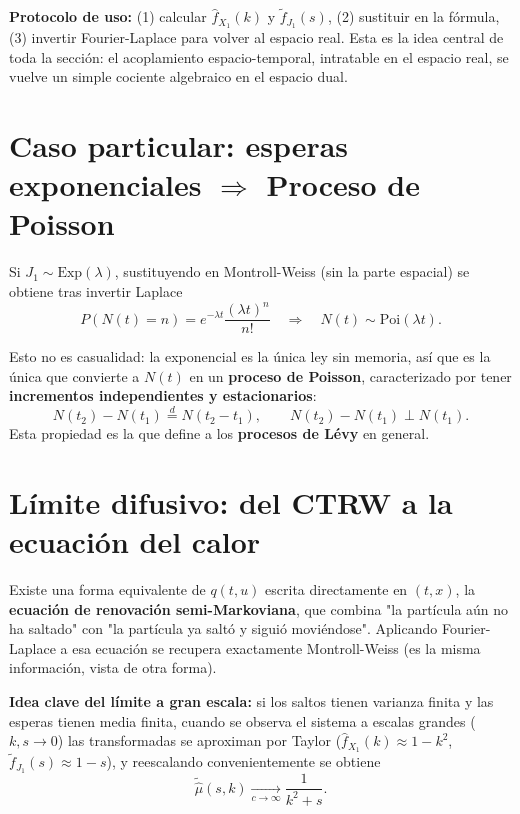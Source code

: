 \documentclass[10pt]{book}
\begin{document}
\noindent
\textbf{Protocolo de uso:} (1) calcular $\hat f_{X_1}(k)$ y $\widetilde f_{J_1}(s)$, (2) sustituir en la fórmula, (3) invertir Fourier-Laplace para volver al espacio real. Esta es la idea central de toda la sección: el acoplamiento espacio-temporal, intratable en el espacio real, se vuelve un simple cociente algebraico en el espacio dual.

\section{Caso particular: esperas exponenciales $\Rightarrow$ Proceso de Poisson}

\begin{ejemplo}
Si $J_1\sim\mathrm{Exp}(\lambda)$, sustituyendo en Montroll-Weiss (sin la parte espacial) se obtiene tras invertir Laplace
\begin{equation*}
    \boxed{P(N(t)=n) = e^{-\lambda t}\frac{(\lambda t)^n}{n!}} \quad\Longrightarrow\quad N(t)\sim\mathrm{Poi}(\lambda t).
\end{equation*}
\end{ejemplo}

\begin{observacion}
Esto no es casualidad: la exponencial es la única ley sin memoria, así que es la única que convierte a $N(t)$ en un \textbf{proceso de Poisson}, caracterizado por tener \textbf{incrementos independientes y estacionarios}:
\begin{equation*}
    N(t_2)-N(t_1) \overset{d}{=} N(t_2-t_1), \qquad N(t_2)-N(t_1)\perp N(t_1).
\end{equation*}
Esta propiedad es la que define a los \textbf{procesos de Lévy} en general.
\end{observacion}

\section{Límite difusivo: del CTRW a la ecuación del calor}

\noindent
Existe una forma equivalente de $q(t,u)$ escrita directamente en $(t,x)$, la \textbf{ecuación de renovación semi-Markoviana}, que combina "la partícula aún no ha saltado" con "la partícula ya saltó y siguió moviéndose". Aplicando Fourier-Laplace a esa ecuación se recupera exactamente Montroll-Weiss (es la misma información, vista de otra forma).

\noindent
\textbf{Idea clave del límite a gran escala:} si los saltos tienen varianza finita y las esperas tienen media finita, cuando se observa el sistema a escalas grandes ($k,s\to 0$) las transformadas se aproximan por Taylor ($\hat f_{X_1}(k)\approx 1-k^2$, $\widetilde f_{J_1}(s)\approx 1-s$), y reescalando convenientemente se obtiene
\begin{equation*}
    \widetilde{\hat\mu}(s,k) \xrightarrow[c\to\infty]{} \frac{1}{k^2+s}.
\end{equation*}
\end{document}
